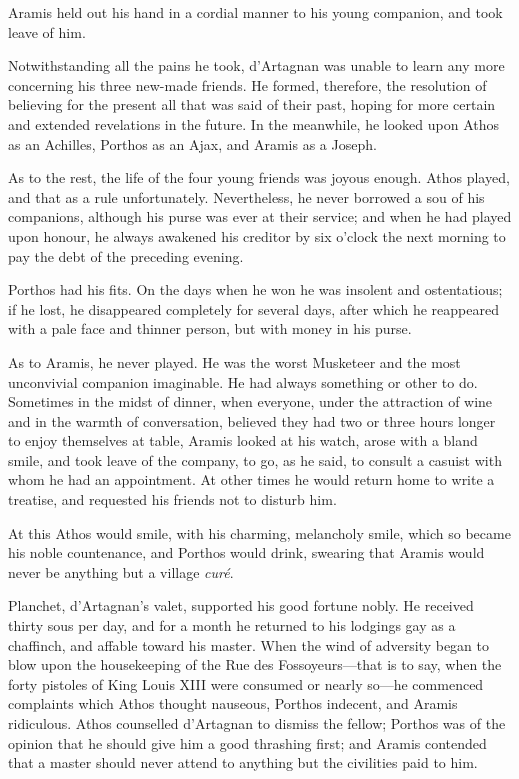 Aramis held out his hand in a cordial manner to his young companion, and took leave of him. 

Notwithstanding all the pains he took, d'Artagnan was unable to learn any more concerning his three new-made friends. He formed, therefore, the resolution of believing for the present all that was said of their past, hoping for more certain and extended revelations in the future. In the meanwhile, he looked upon Athos as an Achilles, Porthos as an Ajax, and Aramis as a Joseph. 

As to the rest, the life of the four young friends was joyous enough. Athos played, and that as a rule unfortunately. Nevertheless, he never borrowed a sou of his companions, although his purse was ever at their service; and when he had played upon honour, he always awakened his creditor by six o'clock the next morning to pay the debt of the preceding evening. 

Porthos had his fits. On the days when he won he was insolent and ostentatious; if he lost, he disappeared completely for several days, after which he reappeared with a pale face and thinner person, but with money in his purse. 

As to Aramis, he never played. He was the worst Musketeer and the most unconvivial companion imaginable. He had always something or other to do. Sometimes in the midst of dinner, when everyone, under the attraction of wine and in the warmth of conversation, believed they had two or three hours longer to enjoy themselves at table, Aramis looked at his watch, arose with a bland smile, and took leave of the company, to go, as he said, to consult a casuist with whom he had an appointment. At other times he would return home to write a treatise, and requested his friends not to disturb him. 

At this Athos would smile, with his charming, melancholy smile, which so became his noble countenance, and Porthos would drink, swearing that Aramis would never be anything but a village \textit{curé}. 

Planchet, d'Artagnan's valet, supported his good fortune nobly. He received thirty sous per day, and for a month he returned to his lodgings gay as a chaffinch, and affable toward his master. When the wind of adversity began to blow upon the housekeeping of the Rue des Fossoyeurs---that is to say, when the forty pistoles of King Louis XIII were consumed or nearly so---he commenced complaints which Athos thought nauseous, Porthos indecent, and Aramis ridiculous. Athos counselled d'Artagnan to dismiss the fellow; Porthos was of the opinion that he should give him a good thrashing first; and Aramis contended that a master should never attend to anything but the civilities paid to him. 

